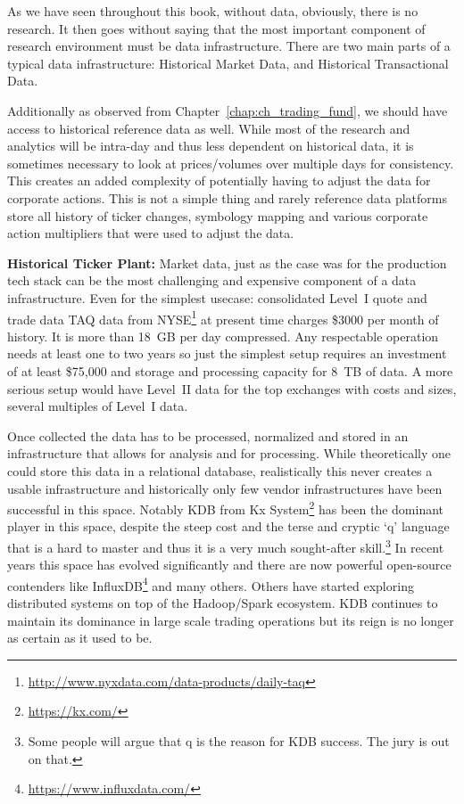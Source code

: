 As we have seen throughout this book, without data, obviously, there is no research. It then goes without saying that the most important component of research environment must be data infrastructure. There are two main parts of a typical data infrastructure: Historical Market Data, and Historical Transactional Data. 


Additionally as observed from Chapter~\ref{chap:ch_trading_fund}, we should have access to historical reference data as well. While most of the research and analytics will be intra-day and thus less dependent on historical data, it is sometimes necessary to look at prices/volumes over multiple days for consistency. This creates an added complexity of potentially having to adjust the data for corporate actions. This is not a simple thing and rarely reference data platforms store all history of ticker changes, symbology mapping and various corporate action multipliers that were used to adjust the data. \twomedskip


\noindent\textbf{Historical Ticker Plant:} Market data, just as the case was for the production tech stack can be the most challenging and expensive component of a data infrastructure. Even for  the simplest usecase: consolidated Level~I quote and trade data TAQ data\label{in:taq3} from NYSE\footnote{\url{http://www.nyxdata.com/data-products/daily-taq}} at present time charges \$3000 per month of history. It is more than 18~GB per day compressed. Any respectable operation needs at least one to two years so just the simplest setup requires an investment of at least \$75,000 and storage and processing capacity for 8~TB of data. A more serious setup would have Level~II data for the top exchanges with costs and sizes, several multiples of Level~I data. \label{in:level2dat2}


Once collected the data has to be processed, normalized and stored in an infrastructure that allows for analysis and for processing. While theoretically one could store this data in a relational database, realistically this never creates a usable infrastructure and historically only few vendor infrastructures have been successful in this space. Notably KDB from Kx System\footnote{\url{https://kx.com/}} has been the dominant player in this space, despite the steep cost and the terse and cryptic `q' language that is a hard to master and thus it is a very much sought-after skill.\footnote{Some people will argue that q is the reason for KDB success. The jury is out on that.} In recent years this space has evolved significantly and there are now powerful open-source contenders like InfluxDB\footnote{\url{https://www.influxdata.com/}} and many others. Others have started exploring distributed systems on top of the Hadoop/Spark ecosystem. KDB continues to maintain its dominance in large scale trading operations but its reign is no longer as certain as it used to be.


